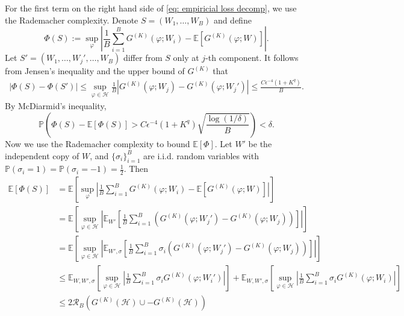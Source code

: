 \documentclass[twoside,11pt]{article}
\newcommand{\E}{\mathbb{E}}
\newcommand{\p}{\mathbb{P}}
\newcommand{\cH}{\mathcal{H}}
\newcommand{\1}{\mathbf{1}}
\numberwithin{equation}{section}
\begin{document}
For the first term on the right hand side of \eqref{eq: empiricial loss decomp}, we use the Rademacher complexity. Denote $ S = (W_1,\dots,W_B)$ and define
\begin{equation}
\Phi(S):= \sup_{\varphi}\left| \frac{1}{B}\sum_{i=1}^B G^{(K)}(\varphi;W_i) - \E\left[ G^{(K)}(\varphi;W)\right]\right|.
\end{equation}
Let $ S' = (W_1,\dots,W_j',\dots,W_B)$ differ from $ S$ only at $ j$-th component. It follows from Jensen's inequality and the upper bound of $ G^{(K)}$ that
\begin{equation}
    \begin{aligned}
        \left| \Phi(S) - \Phi(S')\right| \le \sup_{\varphi\in\cH}\frac{1}{B}\left|G^{(K)}(\varphi;W_j) - G^{(K)}(\varphi;W_j') \right| \le \frac{ C \epsilon^{-4}(1+ K^{q})}{B}.
    \end{aligned}
\end{equation}
By McDiarmid's inequality,
\begin{equation}\label{eq: term1 bound}
    \p\left( \Phi(S) - \E[\Phi(S)] > C\epsilon^{-4}(1+K^{q})
    \sqrt{\frac{\log(1/\delta)}{B}}\right) < \delta.
\end{equation}
Now we use the Rademacher complexity to bound $ \E[\Phi]$. Let $ W'$ be the independent copy of $ W$, and $
\{\sigma_i\}_{i=1}^B$ are i.i.d. random variables with $ \p(\sigma_i=1) = \p(\sigma_i = -1) = \frac{1}{2}$. Then
\begin{equation}
    \begin{aligned}\label{eq: expect rademecher bound}
        \E[\Phi(S)] &= \E\left[\sup_{\varphi}\left| \frac{1}{B}\sum_{i=1}^B G^{(K)}(\varphi;W_i) - \E\left[ G^{(K)}(\varphi;W)\right]\right| \right]\\
        &= \E\left[ \sup_{\varphi \in \cH}\left| \E_{W'}\left[ \frac{1}{B}\sum_{i=1}^B\left( G^{(K)}(\varphi;W_j') -G^{(K)}(\varphi;W_j)\right)\right]\right|\right]\\
        &=\E\left[ \sup_{\varphi \in \cH}\left| \E_{W',\sigma}\left[ \frac{1}{B}\sum_{i=1}^B\sigma_i\left( G^{(K)}(\varphi;W_j') -G^{(K)}(\varphi;W_j)\right)\right]\right|\right]\\
        & \le \E_{W,W',\sigma}\left[ \sup_{\varphi \in \cH}\left| \frac{1}{B}\sum_{i=1}^B \sigma_i G^{(K)}(\varphi;W_i')\right|\right] + \E_{W,W',\sigma}\left[ \sup_{\varphi \in \cH}\left| \frac{1}{B}\sum_{i=1}^B \sigma_i G^{(K)}(\varphi;W_i)\right|\right]\\
        & \le 2\mathcal{R}_B(G^{(K)}(\cH) \cup -G^{(K)}(\cH))
    \end{aligned}
\end{equation}
\end{document}
